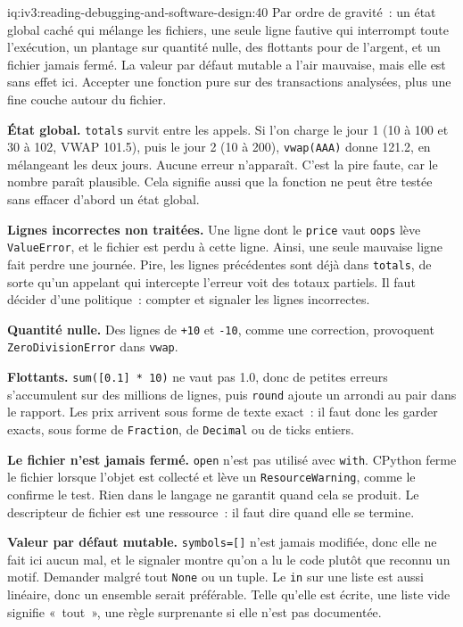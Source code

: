 \begin{solution}{iq:iv3:reading-debugging-and-software-design:40}
Par ordre de gravité~: un état global caché qui mélange les fichiers, une seule ligne fautive qui interrompt toute l'exécution, un plantage sur quantité nulle, des flottants pour de l'argent, et un fichier jamais fermé. La valeur par défaut mutable a l'air mauvaise, mais elle est sans effet ici. Accepter une fonction pure sur des transactions analysées, plus une fine couche autour du fichier.

\textbf{État global.} \texttt{totals} survit entre les appels. Si l'on charge le jour 1 (10 à 100 et 30 à 102, VWAP 101.5), puis le jour 2 (10 à 200), \texttt{vwap(\textquotedbl{}AAA\textquotedbl{})} donne 121.2, en mélangeant les deux jours. Aucune erreur n'apparaît. C'est la pire faute, car le nombre paraît plausible. Cela signifie aussi que la fonction ne peut être testée sans effacer d'abord un état global.

\textbf{Lignes incorrectes non traitées.} Une ligne dont le \texttt{price} vaut \texttt{oops} lève \texttt{ValueError}, et le fichier est perdu à cette ligne. Ainsi, une seule mauvaise ligne fait perdre une journée. Pire, les lignes précédentes sont déjà dans \texttt{totals}, de sorte qu'un appelant qui intercepte l'erreur voit des totaux partiels. Il faut décider d'une politique~: compter et signaler les lignes incorrectes.

\begin{sloppypar}\textbf{Quantité nulle.} Des lignes de \texttt{+10} et \texttt{-10}, comme une correction, provoquent \texttt{ZeroDivisionError} dans \texttt{vwap}.\end{sloppypar}

\textbf{Flottants.} \texttt{sum([0.1] * 10)} ne vaut pas 1.0, donc de petites erreurs s'accumulent sur des millions de lignes, puis \texttt{round} ajoute un arrondi au pair dans le rapport. Les prix arrivent sous forme de texte exact~: il faut donc les garder exacts, sous forme de \texttt{Fraction}, de \texttt{Decimal} ou de ticks entiers.

\textbf{Le fichier n'est jamais fermé.} \texttt{open} n'est pas utilisé avec \texttt{with}. CPython ferme le fichier lorsque l'objet est collecté et lève un \texttt{ResourceWarning}, comme le confirme le test. Rien dans le langage ne garantit quand cela se produit. Le descripteur de fichier est une ressource~: il faut dire quand elle se termine.

\textbf{Valeur par défaut mutable.} \texttt{symbols=[]} n'est jamais modifiée, donc elle ne fait ici aucun mal, et le signaler montre qu'on a lu le code plutôt que reconnu un motif. Demander malgré tout \texttt{None} ou un tuple. Le \texttt{in} sur une liste est aussi linéaire, donc un ensemble serait préférable. Telle qu'elle est écrite, une liste vide signifie «~tout~», une règle surprenante si elle n'est pas documentée.


\end{solution}
